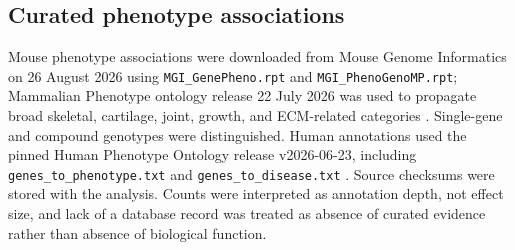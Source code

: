 \subsection{Curated phenotype associations}
\label{subsec:phenotype-analysis}

Mouse phenotype associations were downloaded from Mouse Genome Informatics on
26 August 2026 using \texttt{MGI\_GenePheno.rpt} and
\texttt{MGI\_PhenoGenoMP.rpt}; Mammalian Phenotype ontology release 22 July 2026
was used to propagate broad skeletal, cartilage, joint, growth, and ECM-related
categories \citep{Baldarelli2024MGI}. Single-gene and compound genotypes were
distinguished. Human annotations used the pinned Human Phenotype Ontology
release v2026-06-23, including \texttt{genes\_to\_phenotype.txt} and
\texttt{genes\_to\_disease.txt} \citep{Gargano2024HPO}. Source checksums were
stored with the analysis. Counts were interpreted as annotation depth, not
effect size, and lack of a database record was treated as absence of curated
evidence rather than absence of biological function.
